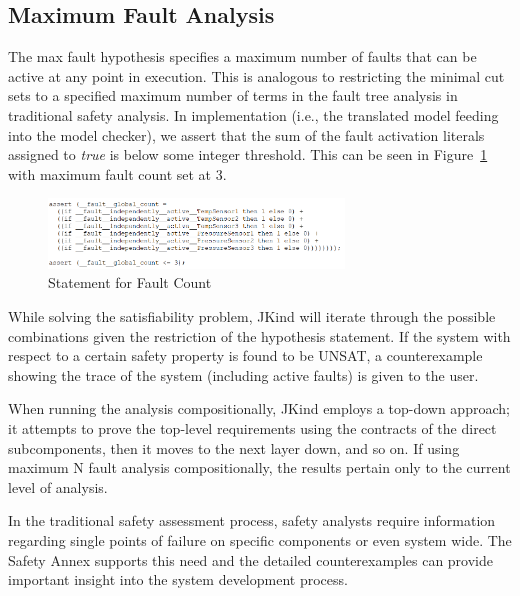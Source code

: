\subsection{Maximum Fault Analysis}
The max fault hypothesis specifies a maximum number of faults that can be active at any point in execution. This is analogous to restricting the minimal cut sets to a specified maximum number of terms in the fault tree analysis in traditional safety analysis. In implementation (i.e., the translated \lustre model feeding into the model checker), we assert that the sum of the fault activation literals assigned to \textit{true} is below some integer threshold. This can be seen in Figure~\ref{fig:count} with maximum fault count set at 3.
\begin{figure}[h]
	\begin{center}
		\includegraphics[width=0.7\textwidth]{images/assertCount.PNG}
	\end{center}
	\caption{\lustre Statement for Fault Count}
	\label{fig:count}
\end{figure}
While solving the satisfiability problem, JKind will iterate through the possible combinations given the restriction of the hypothesis statement. If the system with respect to a certain safety property is found to be UNSAT, a counterexample showing the trace of the system (including active faults) is given to the user. 

When running the analysis compositionally, JKind employs a top-down approach; it attempts to prove the top-level requirements using the contracts of the direct subcomponents, then it moves to the next layer down, and so on. If using maximum N fault analysis compositionally, the results pertain only to the current level of analysis.

In the traditional safety assessment process, safety analysts require information regarding single points of failure on specific components or even system wide. The Safety Annex supports this need and the detailed counterexamples can provide important insight into the system development process. 

